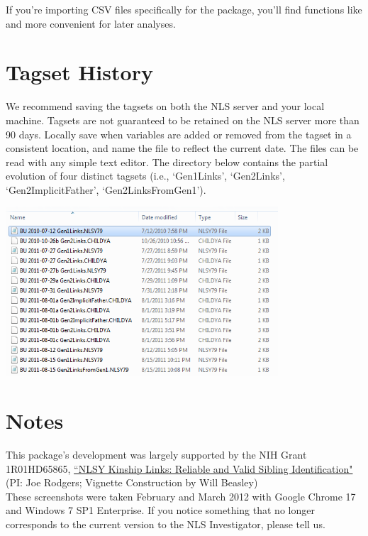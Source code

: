 \documentclass{article}\usepackage[]{graphicx}\usepackage[]{color}
\begin{document}
If you're importing CSV files specifically for the  package, you'll find functions like  and  more convenient for later analyses.
\section{Tagset History}
We recommend saving the tagsets on both the NLS server and your local machine.  Tagsets are not guaranteed to be retained on the NLS server more than 90 days.  Locally save when variables are added or removed from the tagset in a consistent location, and name the file to reflect the current date.  The files can be read with any simple text editor.  The directory below contains the partial evolution of four distinct tagsets (i.e., `Gen1Links', `Gen2Links', `Gen2ImplicitFather', `Gen2LinksFromGen1').

\includegraphics[width=4in]{./GraphicsNlsInvestigator/TagsetBackups.png}

\section{Notes}
This package's development was largely supported by the NIH Grant 1R01HD65865, \href{http://taggs.hhs.gov/AwardDetail.cfm?s_Award_Num=R01HD065865&n_Prog_Office_Code=50}{``NLSY Kinship Links: Reliable and Valid Sibling Identification"} (PI: Joe Rodgers; Vignette Construction by Will Beasley)\\


These screenshots were taken February and March 2012 with Google Chrome 17 and Windows 7 SP1 Enterprise.  If you notice something that no longer corresponds to the current version to the NLS Investigator, please tell us.
\end{document}
